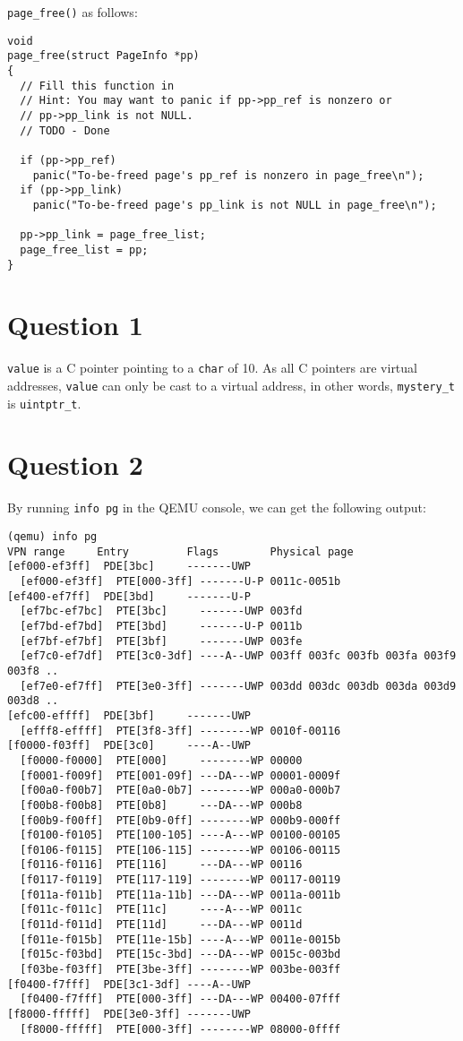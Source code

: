 \documentclass[]{article}
\begin{document}
\verb|page_free()| as follows:

\begin{verbatim}
void
page_free(struct PageInfo *pp)
{
  // Fill this function in
  // Hint: You may want to panic if pp->pp_ref is nonzero or
  // pp->pp_link is not NULL.
  // TODO - Done
 
  if (pp->pp_ref)
    panic("To-be-freed page's pp_ref is nonzero in page_free\n");
  if (pp->pp_link)
    panic("To-be-freed page's pp_link is not NULL in page_free\n");
 
  pp->pp_link = page_free_list;
  page_free_list = pp;
}
\end{verbatim}

\section*{Question 1}
\verb|value| is a C pointer pointing to a \verb|char| of 10. As all C pointers are virtual addresses, \verb|value| can only be cast to a virtual address, in other words, \verb|mystery_t| is \verb|uintptr_t|.

\section*{Question 2}
By running \verb|info pg| in the QEMU console, we can get the following output:
\begin{verbatim}
(qemu) info pg
VPN range     Entry         Flags        Physical page
[ef000-ef3ff]  PDE[3bc]     -------UWP
  [ef000-ef3ff]  PTE[000-3ff] -------U-P 0011c-0051b
[ef400-ef7ff]  PDE[3bd]     -------U-P
  [ef7bc-ef7bc]  PTE[3bc]     -------UWP 003fd
  [ef7bd-ef7bd]  PTE[3bd]     -------U-P 0011b
  [ef7bf-ef7bf]  PTE[3bf]     -------UWP 003fe
  [ef7c0-ef7df]  PTE[3c0-3df] ----A--UWP 003ff 003fc 003fb 003fa 003f9 003f8 ..
  [ef7e0-ef7ff]  PTE[3e0-3ff] -------UWP 003dd 003dc 003db 003da 003d9 003d8 ..
[efc00-effff]  PDE[3bf]     -------UWP
  [efff8-effff]  PTE[3f8-3ff] --------WP 0010f-00116
[f0000-f03ff]  PDE[3c0]     ----A--UWP
  [f0000-f0000]  PTE[000]     --------WP 00000
  [f0001-f009f]  PTE[001-09f] ---DA---WP 00001-0009f
  [f00a0-f00b7]  PTE[0a0-0b7] --------WP 000a0-000b7
  [f00b8-f00b8]  PTE[0b8]     ---DA---WP 000b8
  [f00b9-f00ff]  PTE[0b9-0ff] --------WP 000b9-000ff
  [f0100-f0105]  PTE[100-105] ----A---WP 00100-00105
  [f0106-f0115]  PTE[106-115] --------WP 00106-00115
  [f0116-f0116]  PTE[116]     ---DA---WP 00116
  [f0117-f0119]  PTE[117-119] --------WP 00117-00119
  [f011a-f011b]  PTE[11a-11b] ---DA---WP 0011a-0011b
  [f011c-f011c]  PTE[11c]     ----A---WP 0011c
  [f011d-f011d]  PTE[11d]     ---DA---WP 0011d
  [f011e-f015b]  PTE[11e-15b] ----A---WP 0011e-0015b
  [f015c-f03bd]  PTE[15c-3bd] ---DA---WP 0015c-003bd
  [f03be-f03ff]  PTE[3be-3ff] --------WP 003be-003ff
[f0400-f7fff]  PDE[3c1-3df] ----A--UWP
  [f0400-f7fff]  PTE[000-3ff] ---DA---WP 00400-07fff
[f8000-fffff]  PDE[3e0-3ff] -------UWP
  [f8000-fffff]  PTE[000-3ff] --------WP 08000-0ffff
\end{verbatim}
\end{document}

